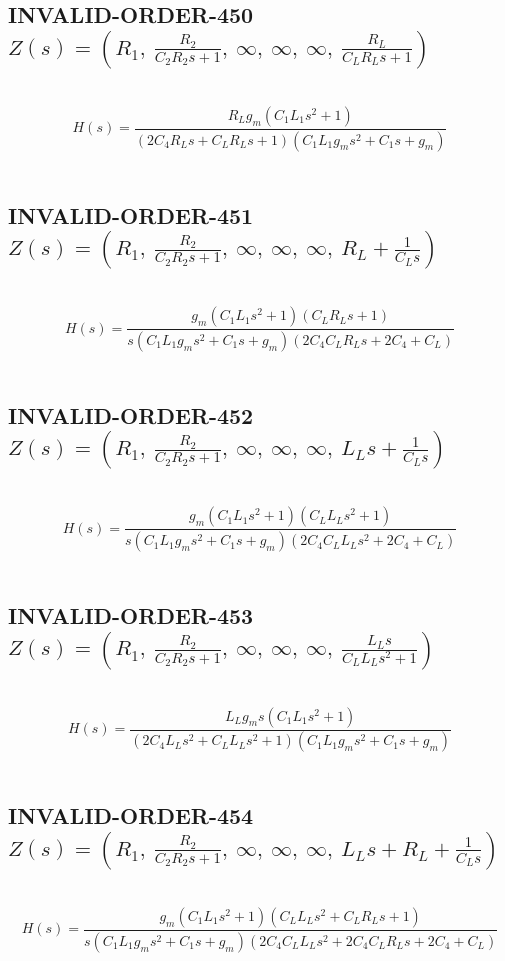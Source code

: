\documentclass{article}
\begin{document}
\subsection{INVALID-ORDER-450 $Z(s) = \left( R_{1}, \  \frac{R_{2}}{C_{2} R_{2} s + 1}, \  \infty, \  \infty, \  \infty, \  \frac{R_{L}}{C_{L} R_{L} s + 1}\right)$ } \ 
\textbf{\[H(s) = \frac{R_{L} g_{m} \left(C_{1} L_{1} s^{2} + 1\right)}{\left(2 C_{4} R_{L} s + C_{L} R_{L} s + 1\right) \left(C_{1} L_{1} g_{m} s^{2} + C_{1} s + g_{m}\right)}\] } \ 
\subsection{INVALID-ORDER-451 $Z(s) = \left( R_{1}, \  \frac{R_{2}}{C_{2} R_{2} s + 1}, \  \infty, \  \infty, \  \infty, \  R_{L} + \frac{1}{C_{L} s}\right)$ } \ 
\textbf{\[H(s) = \frac{g_{m} \left(C_{1} L_{1} s^{2} + 1\right) \left(C_{L} R_{L} s + 1\right)}{s \left(C_{1} L_{1} g_{m} s^{2} + C_{1} s + g_{m}\right) \left(2 C_{4} C_{L} R_{L} s + 2 C_{4} + C_{L}\right)}\] } \ 
\subsection{INVALID-ORDER-452 $Z(s) = \left( R_{1}, \  \frac{R_{2}}{C_{2} R_{2} s + 1}, \  \infty, \  \infty, \  \infty, \  L_{L} s + \frac{1}{C_{L} s}\right)$ } \ 
\textbf{\[H(s) = \frac{g_{m} \left(C_{1} L_{1} s^{2} + 1\right) \left(C_{L} L_{L} s^{2} + 1\right)}{s \left(C_{1} L_{1} g_{m} s^{2} + C_{1} s + g_{m}\right) \left(2 C_{4} C_{L} L_{L} s^{2} + 2 C_{4} + C_{L}\right)}\] } \ 
\subsection{INVALID-ORDER-453 $Z(s) = \left( R_{1}, \  \frac{R_{2}}{C_{2} R_{2} s + 1}, \  \infty, \  \infty, \  \infty, \  \frac{L_{L} s}{C_{L} L_{L} s^{2} + 1}\right)$ } \ 
\textbf{\[H(s) = \frac{L_{L} g_{m} s \left(C_{1} L_{1} s^{2} + 1\right)}{\left(2 C_{4} L_{L} s^{2} + C_{L} L_{L} s^{2} + 1\right) \left(C_{1} L_{1} g_{m} s^{2} + C_{1} s + g_{m}\right)}\] } \ 
\subsection{INVALID-ORDER-454 $Z(s) = \left( R_{1}, \  \frac{R_{2}}{C_{2} R_{2} s + 1}, \  \infty, \  \infty, \  \infty, \  L_{L} s + R_{L} + \frac{1}{C_{L} s}\right)$ } \ 
\textbf{\[H(s) = \frac{g_{m} \left(C_{1} L_{1} s^{2} + 1\right) \left(C_{L} L_{L} s^{2} + C_{L} R_{L} s + 1\right)}{s \left(C_{1} L_{1} g_{m} s^{2} + C_{1} s + g_{m}\right) \left(2 C_{4} C_{L} L_{L} s^{2} + 2 C_{4} C_{L} R_{L} s + 2 C_{4} + C_{L}\right)}\] } \ 
\end{document}
